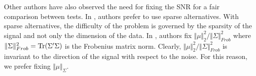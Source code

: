 \documentclass[]{bio}
\begin{document}
Other authors have also observed the need for fixing the SNR for a fair comparison between tests.
In \cite{ramdas2015decreasing}, authors prefer to use sparse alternatives.
With sparse alternatives, the difficulty of the problem is governed by the sparsity of the signal and not only the dimension of the data. 
In \cite{chen2010two}, authors fix $\Vert \mu \Vert_2^2/\Vert \Sigma \Vert^2_{Frob}$ where $\Vert \Sigma \Vert^2_{Frob}=\operatorname{Tr}(\Sigma'\Sigma)$ is the Frobenius matrix norm. 
Clearly, $\Vert \mu \Vert_2^2/\Vert \Sigma \Vert^2_{Frob}$ is invariant to the direction of the signal with respect to the noise. 
For this reason, we prefer fixing $\Vert \mu \Vert_\Sigma$.












\newpage


\end{document}
